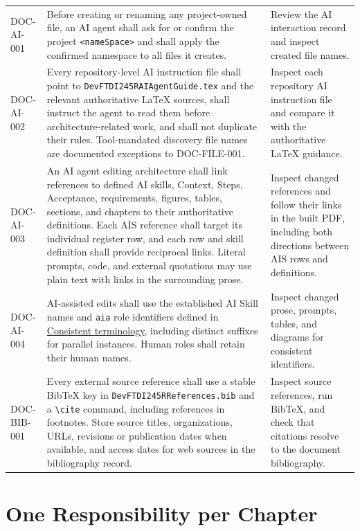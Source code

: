 \begin{tabularx}{\linewidth}{L{2.5cm}Y L{3.0cm}}
DOC-AI-001 & Before creating or renaming any project-owned file, an AI agent
shall ask for or confirm the project \texttt{\textless nameSpace\textgreater}
and shall apply the confirmed namespace to all files it creates. & Review the
AI interaction record and inspect created file names.\\
DOC-AI-002 & Every repository-level AI instruction file shall point to
\texttt{DevFTDI245RAIAgentGuide.tex} and the relevant authoritative LaTeX sources,
shall instruct the agent to read them before architecture-related work, and
shall not duplicate their rules. Tool-mandated discovery file names are
documented exceptions to DOC-FILE-001. & Inspect each repository AI instruction
file and compare it with the authoritative LaTeX guidance.\\
\label{Requirement:DOCAI003}DOC-AI-003 & An AI agent editing
architecture shall link references to defined AI skills, Context, Steps,
Acceptance, requirements, figures, tables, sections, and chapters to their
authoritative definitions. Each AIS reference shall target its individual
register row, and each row and skill definition shall provide reciprocal links.
Literal prompts, code, and external quotations may use plain text with links
in the surrounding prose. & Inspect changed references and follow their links
in the built PDF, including both directions between AIS rows and definitions.\\
\label{Requirement:DOCAI004}DOC-AI-004 & AI-assisted edits shall use the established AI Skill names and \texttt{aia} role identifiers defined in \hyperref[Rule:AITerminologyConsistency]{Consistent terminology}, including distinct suffixes for parallel instances. Human roles shall retain their human names. & Inspect changed prose, prompts, tables, and diagrams for consistent identifiers.\\
\label{Requirement:DOCBIB001}DOC-BIB-001 & Every external source reference shall use a stable BibTeX key in \texttt{DevFTDI245RReferences.bib} and a \texttt{\textbackslash cite} command, including references in footnotes. Store source titles, organizations, URLs, revisions or publication dates when available, and access dates for web sources in the bibliography record. & Inspect source references, run BibTeX, and check that citations resolve to the document bibliography.\\
\end{tabularx}
\normalsize

\section{One Responsibility per Chapter}
\label{Section:ChapterResponsibilityConvention}

